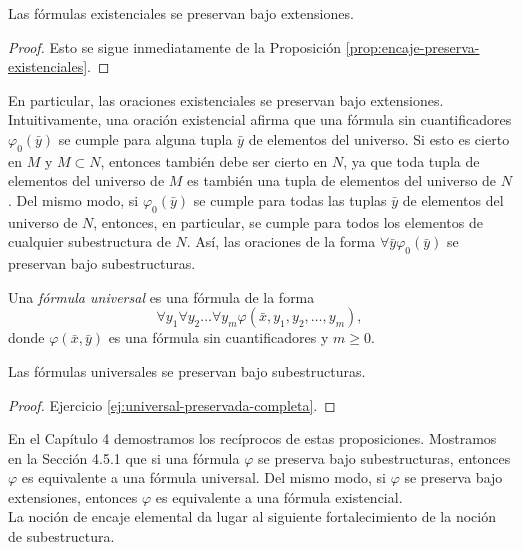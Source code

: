\documentclass[12pt,a4paper]{book}
\begin{document}
    \begin{proposicion}\label{prop:existencial-preservada-extensiones}
        Las fórmulas existenciales se preservan bajo extensiones.
    \end{proposicion}
    \begin{proof}
        Esto se sigue inmediatamente de la Proposición \ref{prop:encaje-preserva-existenciales}.
    \end{proof}

    En particular, las oraciones existenciales se preservan bajo extensiones. Intuitivamente, una oración existencial
    afirma que una fórmula sin cuantificadores $\varphi_{0}(\bar{y})$ se cumple para alguna tupla $\bar{y}$ de elementos
    del universo. Si esto es cierto en $M$ y $M\subset N$, entonces también debe ser cierto en $N$, ya que toda tupla de
    elementos del universo de $M$ es también una tupla de elementos del universo de $N$. Del mismo modo, si
    $\varphi_{0}(\bar{y})$ se cumple para todas las tuplas $\bar{y}$ de elementos del universo de $N$, entonces, en
    particular, se cumple para todos los elementos de cualquier subestructura de $N$. Así, las oraciones de la forma
    $\forall\bar{y}\varphi_{0}(\bar{y})$ se preservan bajo subestructuras.

    \begin{definicion}\label{def:formula-universal}
        Una \textit{fórmula universal} es una fórmula de la forma
        \begin{equation*}
            \forall y_{1}\forall y_{2}\dots\forall y_{m}\varphi(\bar{x},y_{1},y_{2},\dots,y_{m}),
        \end{equation*}
        donde $\varphi(\bar{x},\bar{y})$ es una fórmula sin cuantificadores y $m\geq 0$.
    \end{definicion}

    \begin{proposicion}\label{prop:universal-preservada-subestructuras}
        Las fórmulas universales se preservan bajo subestructuras.
    \end{proposicion}
    \begin{proof}
        Ejercicio \ref{ej:universal-preservada-completa}.
    \end{proof}

    En el Capítulo 4 demostramos los recíprocos de estas proposiciones. Mostramos en la Sección 4.5.1 que si una fórmula
    $\varphi$ se preserva bajo subestructuras, entonces $\varphi$ es equivalente a una fórmula universal. Del mismo modo,
    si $\varphi$ se preserva bajo extensiones, entonces $\varphi$ es equivalente a una fórmula existencial.\\
    La noción de encaje elemental da lugar al siguiente fortalecimiento de la noción de subestructura.
\end{document}
